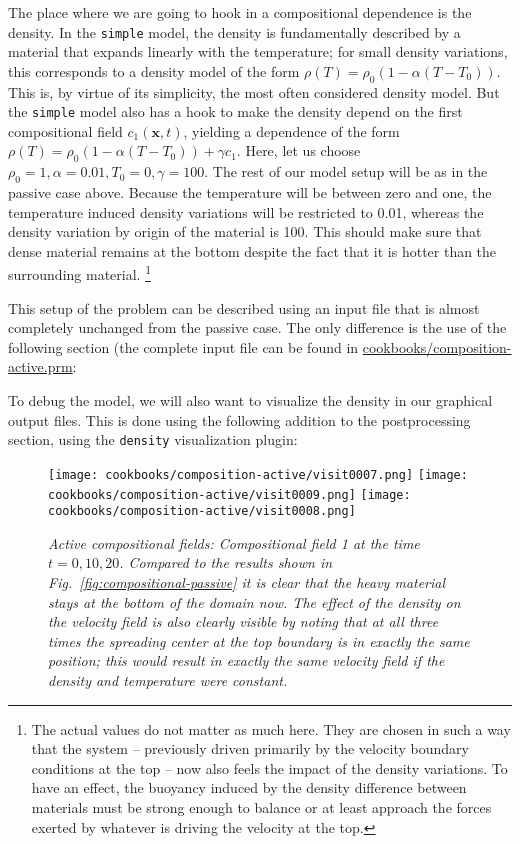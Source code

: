 \documentclass{article}
\begin{document}
The place where we are going to hook in a compositional dependence is the
density. In the \texttt{simple} model, the density is fundamentally described by
a material that expands linearly with the temperature; for small density
variations, this corresponds to a density model of the form
$\rho(T)=\rho_0(1-\alpha(T-T_0))$. This is, by virtue of its simplicity, the
most often considered density model. But the \texttt{simple} model also has a
hook to make the density depend on the first compositional field $c_1(\mathbf
x,t)$, yielding a dependence of the form
$\rho(T)=\rho_0(1-\alpha(T-T_0))+\gamma c_1$. Here, let us choose $\rho_0=1,
\alpha=0.01, T_0=0, \gamma=100$. The rest of our model setup will be as
in the passive case above. Because the temperature will be between zero and one,
the temperature induced density variations will be restricted to 0.01, whereas
the density variation by origin of the material is 100. This should make sure
that dense material remains at the bottom despite the fact that it is hotter
than the surrounding material.%
\footnote{The actual values do not matter as much here. They are chosen in such
a way that the system -- previously driven primarily by the velocity boundary
conditions at the top -- now also feels the impact of the density variations.
To have an effect, the buoyancy induced by the density difference between
materials must be strong enough to balance or at least approach the forces
exerted by whatever is driving the velocity at the top.}

This setup of the problem can be described using an input file that is almost
completely unchanged from the passive case. The only difference is the use of
the following section (the complete input file can be found in
\url{cookbooks/composition-active.prm}:




To debug the model, we will also want to visualize the density in our
graphical output files. This is done using the following addition to the
postprocessing section, using the \texttt{density} visualization plugin:



\begin{figure}
  \centering
  \centering
  \texttt{[image: cookbooks/composition-active/visit0007.png]}
  \hfill
  \texttt{[image: cookbooks/composition-active/visit0009.png]}
  \hfill
  \texttt{[image: cookbooks/composition-active/visit0008.png]}
  \caption{\it Active compositional fields: Compositional field 1 at the time
    $t=0, 10, 20$. Compared to the results shown in
    Fig.~\ref{fig:compositional-passive} it is clear that the heavy material
    stays at the bottom of the domain now. The effect of the density on the
    velocity field is also clearly visible by noting that at all three times
    the spreading center at the top boundary is in exactly the same position;
    this would result in exactly the same velocity field if the density and
    temperature were constant.}
  \label{fig:composition-active-composition}
\end{figure}
\end{document}

